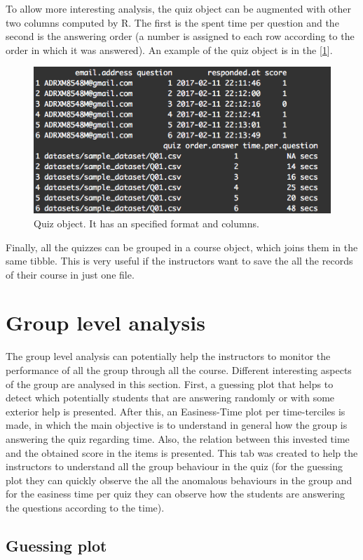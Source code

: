 To allow more interesting analysis, the quiz object can be augmented with other two columns computed by R. The first is the spent time per question and the second is the answering order (a number is assigned to each row according to the order in which it was answered). An example of the quiz object is in the [\cref{img:quiz_object}]. 

\begin{figure}[ht!]
  \centering
  \includegraphics[width=.75\linewidth]{img/quiz_object.png}
  \caption{Quiz object. It has an specified format and columns.}
  \label{img:quiz_object}
\end{figure}

Finally, all the quizzes can be grouped in a course object, which joins them in the same tibble. This is very useful if the instructors want to save the all the records of their course in just one file.

\section{Group level analysis}
The group level analysis can potentially help the instructors to monitor the performance of all the group through all the course. Different interesting aspects of the group are analysed in this section. First, a guessing plot that helps to detect which potentially students that are answering randomly or with some exterior help is presented. After this, an Easiness-Time plot per time-terciles is made, in which the main objective is to understand in general how the group is answering the quiz regarding time. Also, the relation between this invested time and the obtained score in the items is presented. This tab was created to help the instructors to understand all the group behaviour in the quiz (for the guessing plot they can quickly observe the all the anomalous behaviours in the group and for the easiness time per quiz they can observe how the students are answering the questions according to the time).

\subsection{Guessing plot}


